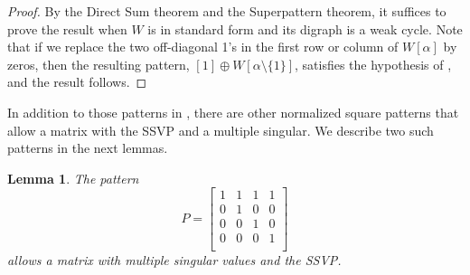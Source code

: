 \documentclass[preprint,12pt]{elsarticle}
\newtheorem{lemma}[theorem]{Lemma}
\begin{document}
\begin{proof}
By the Direct Sum theorem and the Superpattern theorem,
it suffices to prove the result when $W$ is in standard form and its digraph is a weak cycle. 
Note that if we replace the two off-diagonal 1's
in  the first row or column of $W[\alpha]$ by zeros, 
then the resulting pattern, $[1] \oplus W[\alpha\setminus \{1\}]$,
satisfies the hypothesis of , and the result follows. 
\end{proof}

In addition to those patterns in ,
there are other normalized square patterns 
that allow a matrix with the SSVP and a multiple singular.  We describe two such patterns in the next lemmas. 
 

\begin{lemma}
\label{deg4}
   The  pattern
    \[ P=
    \left[ 
    \begin{array}{cccc}
         1 & 1 & 1 & 1  \\
         0& 1 & 0 & 0\\
         0 & 0 & 1 & 0\\
         0 & 0 & 0 & 1\\
    \end{array}
    \right]   
    \]
allows  a matrix with multiple singular values and the SSVP.
\end{lemma}
\end{document}

